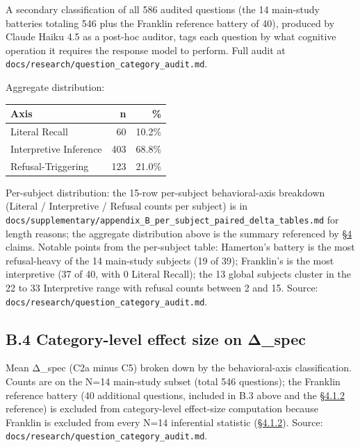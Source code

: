 A secondary classification of all 586 audited questions (the 14
main-study batteries totaling 546 plus the Franklin reference battery of
40), produced by Claude Haiku 4.5 as a post-hoc auditor, tags each
question by what cognitive operation it requires the response model to
perform. Full audit at
\texttt{docs/research/question\_category\_audit.md}.

Aggregate distribution:

\begin{longtable}[]{@{}lrr@{}}
\toprule
Axis & n & \% \\
\midrule
\endhead
Literal Recall & 60 & 10.2\% \\
Interpretive Inference & 403 & 68.8\% \\
Refusal-Triggering & 123 & 21.0\% \\
\bottomrule
\end{longtable}

Per-subject distribution: the 15-row per-subject behavioral-axis
breakdown (Literal / Interpretive / Refusal counts per subject) is in
\texttt{docs/supplementary/appendix\_B\_per\_subject\_paired\_delta\_tables.md}
for length reasons; the aggregate distribution above is the summary
referenced by \hyperref[results]{§4} claims. Notable points from the per-subject table:
Hamerton's battery is the most refusal-heavy of the 14 main-study
subjects (19 of 39); Franklin's is the most interpretive (37 of 40, with
0 Literal Recall); the 13 global subjects cluster in the 22 to 33
Interpretive range with refusal counts between 2 and 15. Source:
\texttt{docs/research/question\_category\_audit.md}.

\hypertarget{b.4-category-level-effect-size-on-ux3b4_spec}{%
\subsection{B.4 Category-level effect size on
Δ\_spec}\label{b.4-category-level-effect-size-on-ux3b4_spec}}

Mean Δ\_spec (C2a minus C5) broken down by the behavioral-axis
classification. Counts are on the N=14 main-study subset (total 546
questions); the Franklin reference battery (40 additional questions,
included in B.3 above and the \hyperref[the-gradient-at-the-high-baseline-end-franklin-reference]{§4.1.2} reference) is excluded from
category-level effect-size computation because Franklin is excluded from
every N=14 inferential statistic (\hyperref[the-gradient-at-the-high-baseline-end-franklin-reference]{§4.1.2}). Source:
\texttt{docs/research/question\_category\_audit.md}.

